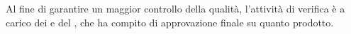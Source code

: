 Al fine di garantire un maggior controllo della qualità, l'attività di verifica è a carico dei \vers e del \Res , che ha compito di approvazione finale su quanto prodotto.